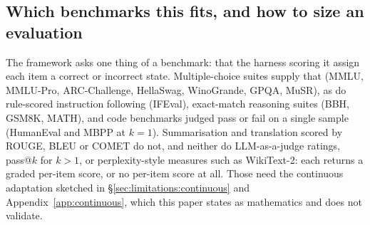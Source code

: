 %
%
%
\subsection{Which benchmarks this fits, and how to size an evaluation}
\label{sec:cert:applicability}

The framework asks one thing of a benchmark: that the harness scoring it assign
each item a correct or incorrect state. Multiple-choice suites supply that
(MMLU, MMLU-Pro, ARC-Challenge, HellaSwag, WinoGrande, GPQA, MuSR), as do
rule-scored instruction following (IFEval), exact-match reasoning suites (BBH,
GSM8K, MATH), and code benchmarks judged pass or fail on a single sample
(HumanEval and MBPP at $k=1$). Summarisation and translation scored by ROUGE,
BLEU or COMET do not, and neither do LLM-as-a-judge ratings, pass@$k$ for
$k>1$, or perplexity-style measures such as WikiText-2: each returns a graded
per-item score, or no per-item score at all. Those need the continuous
adaptation sketched in \S\ref{sec:limitations:continuous} and
Appendix~\ref{app:continuous}, which this paper states as mathematics and does
not validate.

